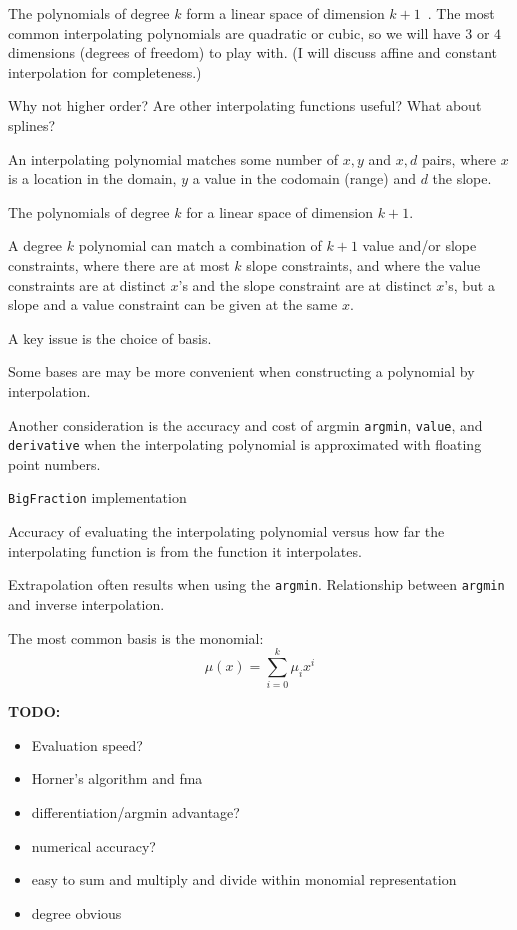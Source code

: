 The polynomials of degree $k$ form a linear space of dimension
$k+1$~\cite{wiki:Polynomial}.
The most common interpolating polynomials are quadratic or cubic,
so we will have $3$ or $4$ dimensions (degrees of freedom) to play
with. 
(I will discuss affine and constant interpolation for 
completeness.)

Why not higher order? Are other interpolating functions useful?
What about splines?

An interpolating polynomial matches some number of $x,y$
and $x,d$ pairs, where $x$ is a location in the domain,
$y$ a value in the codomain (range) and $d$ the slope.

The polynomials of degree $k$ for a linear space of dimension
$k+1$. 

A degree $k$ polynomial can match a combination of $k+1$ value 
and/or 
slope constraints, where there are at most $k$ slope constraints,
and where the value constraints are at distinct $x$'s and the
slope constraint are at distinct $x$'s, but a slope and a value 
constraint can be given at the same $x$.

A key issue is the choice of basis.

Some bases are may be more convenient when constructing a 
polynomial by interpolation.

Another consideration is the accuracy and cost of 
argmin \texttt{argmin}, \texttt{value}, and \texttt{derivative} 
when the interpolating polynomial is approximated with 
floating point numbers.

\texttt{BigFraction} implementation

Accuracy of evaluating the interpolating polynomial
versus how far the interpolating function is from the function it
interpolates.

Extrapolation often results when using the \texttt{argmin}.
Relationship between \texttt{argmin} and inverse interpolation.

\label{sec:Monomial-basis}

The most common basis is the monomial:
\begin{equation}
\mu(x) = \sum_{i=0}^{k} \mu_i x^i
\end{equation}

\textbf{TODO:} 
\begin{itemize}
  \item Evaluation speed?
  \item Horner's algorithm and fma
  \item differentiation/argmin advantage?
  \item numerical accuracy?
  \item easy to sum and multiply and divide within monomial
  representation
  \item degree obvious
\end{itemize}

